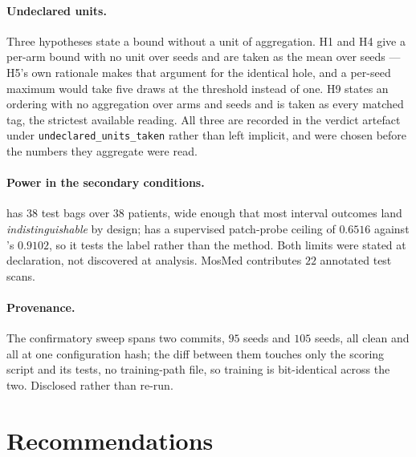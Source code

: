 \documentclass[10pt]{article}
\begin{document}
\paragraph{Undeclared units.} Three hypotheses state a bound without a unit of
aggregation. H1 and H4 give a per-arm bound with no unit over seeds and are taken
as the mean over seeds --- H5's own rationale makes that argument for the
identical hole, and a per-seed maximum would take five draws at the threshold
instead of one. H9 states an ordering with no aggregation over arms and seeds and
is taken as every matched tag, the strictest available reading. All three are
recorded in the verdict artefact under \texttt{undeclared\_units\_taken} rather
than left implicit, and were chosen before the numbers they aggregate were read.

\paragraph{Power in the secondary conditions.} \condC{} has $38$ test bags over
$38$ patients, wide enough that most interval outcomes land
\emph{indistinguishable} by design; \condB{} has a supervised patch-probe ceiling
of $0.6516$ against \condA{}'s $0.9102$, so it tests the label rather than the
method. Both limits were stated at declaration, not discovered at analysis.
MosMed contributes $22$ annotated test scans.

\paragraph{Provenance.} The confirmatory sweep spans two commits, $95$ seeds and
$105$ seeds, all clean and all at one configuration hash; the diff between them
touches only the scoring script and its tests, no training-path file, so training
is bit-identical across the two. Disclosed rather than re-run.

\section{Recommendations}
\end{document}
